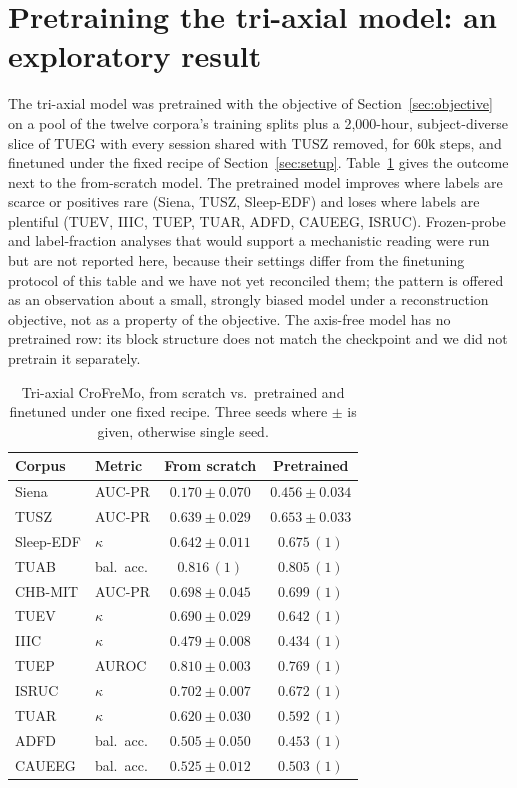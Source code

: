 \section{Pretraining the tri-axial model: an exploratory result}
\label{app:pretrain}

The tri-axial model was pretrained with the objective of
Section~\ref{sec:objective} on a pool of the twelve corpora's training
splits plus a 2,000-hour, subject-diverse slice of TUEG with every session
shared with TUSZ removed, for 60k steps, and finetuned under the fixed
recipe of Section~\ref{sec:setup}. Table~\ref{tab:pretrain-triaxial}
gives the outcome next to the from-scratch model. The pretrained model
improves where labels are scarce or positives rare (Siena, TUSZ,
Sleep-EDF) and loses where labels are plentiful (TUEV, IIIC, TUEP, TUAR,
ADFD, CAUEEG, ISRUC). Frozen-probe and label-fraction analyses that would
support a mechanistic reading were run but are not reported here, because
their settings differ from the finetuning protocol of this table and we
have not yet reconciled them; the pattern is offered as an observation
about a small, strongly biased model under a reconstruction objective,
not as a property of the objective. The axis-free model has no
pretrained row: its block structure does not match the checkpoint and we
did not pretrain it separately.

\begin{table}[h]
\centering
\small
\caption{Tri-axial CroFreMo, from scratch vs.\ pretrained and finetuned
under one fixed recipe. Three seeds where $\pm$ is given, otherwise single
seed.}
\label{tab:pretrain-triaxial}
\begin{tabular}{llcc}
\toprule
Corpus & Metric & From scratch & Pretrained \\
\midrule
Siena & AUC-PR & $0.170 \pm 0.070$ & $\mathbf{0.456 \pm 0.034}$ \\
TUSZ & AUC-PR & $0.639 \pm 0.029$ & $\mathbf{0.653 \pm 0.033}$ \\
Sleep-EDF & $\kappa$ & $0.642 \pm 0.011$ & $\mathbf{0.675}\,(1)$ \\
TUAB & bal.\ acc. & $0.816\,(1)$ & $0.805\,(1)$ \\
CHB-MIT & AUC-PR & $0.698 \pm 0.045$ & $0.699\,(1)$ \\
TUEV & $\kappa$ & $\mathbf{0.690 \pm 0.029}$ & $0.642\,(1)$ \\
IIIC & $\kappa$ & $\mathbf{0.479 \pm 0.008}$ & $0.434\,(1)$ \\
TUEP & AUROC & $\mathbf{0.810 \pm 0.003}$ & $0.769\,(1)$ \\
ISRUC & $\kappa$ & $\mathbf{0.702 \pm 0.007}$ & $0.672\,(1)$ \\
TUAR & $\kappa$ & $\mathbf{0.620 \pm 0.030}$ & $0.592\,(1)$ \\
ADFD & bal.\ acc. & $\mathbf{0.505 \pm 0.050}$ & $0.453\,(1)$ \\
CAUEEG & bal.\ acc. & $\mathbf{0.525 \pm 0.012}$ & $0.503\,(1)$ \\
\bottomrule
\end{tabular}
\end{table}
